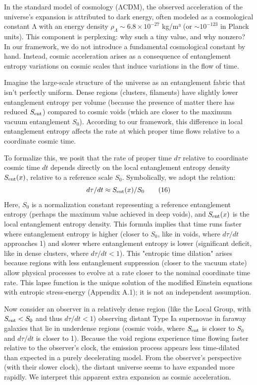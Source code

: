 \documentclass[11pt]{article}
\begin{document}
In the standard model of cosmology (ΛCDM), the observed acceleration of the universe’s expansion is attributed to dark energy, often modeled as a cosmological constant Λ with an energy density $\rho_\Lambda \sim 6.8\times 10^{-27}$ kg/m³ (or $\sim 10^{-123}$ in Planck units). This component is perplexing: why such a tiny value, and why nonzero? In our framework, we do not introduce a fundamental cosmological constant by hand. Instead, cosmic acceleration arises as a consequence of entanglement entropy variations on cosmic scales that induce variations in the flow of time.

Imagine the large-scale structure of the universe as an entanglement fabric that isn’t perfectly uniform. Dense regions (clusters, filaments) have slightly lower entanglement entropy per volume (because the presence of matter there has reduced $S_{\rm ent}$) compared to cosmic voids (which are closer to the maximum vacuum entanglement $S_0$). According to our framework, this difference in local entanglement entropy affects the rate at which proper time flows relative to a coordinate cosmic time.

To formalize this, we posit that the rate of proper time $d\tau$ relative to coordinate cosmic time $dt$ depends directly on the local entanglement entropy density $S_{\rm ent}(x)$, relative to a reference scale $S_0$. Symbolically, we adopt the relation:
\begin{equation}
d\tau/dt \approx S_{\rm ent}(x) / S_0 \label{eq:time-dilation} \tag{16}
\end{equation}
Here, $S_0$ is a normalization constant representing a reference entanglement entropy (perhaps the maximum value achieved in deep voids), and $S_{\rm ent}(x)$ is the local entanglement entropy density. This formula implies that time runs faster where entanglement entropy is higher (closer to $S_0$, like in voids, where $d\tau/dt$ approaches 1) and slower where entanglement entropy is lower (significant deficit, like in dense clusters, where $d\tau/dt < 1$). This "entropic time dilation" arises because regions with less entanglement suppression (closer to the vacuum state) allow physical processes to evolve at a rate closer to the nominal coordinate time rate. This lapse function is the unique solution of the modified Einstein equations with entropic stress‑energy (Appendix A.1); it is not an independent assumption.

Now consider an observer in a relatively dense region (like the Local Group, with $S_{\rm ent} < S_0$ and thus $d\tau/dt < 1$) observing distant Type Ia supernovae in faraway galaxies that lie in underdense regions (cosmic voids, where $S_{\rm ent}$ is closer to $S_0$ and $d\tau/dt$ is closer to 1). Because the void regions experience time flowing faster relative to the observer's clock, the emission process appears less time-dilated than expected in a purely decelerating model. From the observer's perspective (with their slower clock), the distant universe seems to have expanded more rapidly. We interpret this apparent extra expansion as cosmic acceleration.
\end{document}
